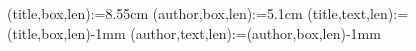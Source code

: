 \novaims(title,box,len):={8.55cm}
\novaims(author,box,len):={5.1cm}
\novaims(title,text,len):={\dimexpr \thenovaims(title,box,len)-1mm}
\novaims(author,text,len):={\dimexpr \thenovaims(author,box,len)-1mm}

\newlength{\novathesis@spinewidth}%
\setlength{\novathesis@spinewidth}{1mm * (\thelastsheet+ 19) / 20}%

\newlength{\novathesis@boxwidth}
\ifdim\novathesis@spinewidth > 6mm
  \setlength{\novathesis@boxwidth}{\novathesis@spinewidth-2mm}%
\else
  \setlength{\novathesis@boxwidth}{4mm}%
\fi
\newlength{\novathesis@spinetextwidth}
\setlength{\novathesis@spinetextwidth}{\novathesis@boxwidth-1mm}%


\newlength{\spine@len@top}
\setlength{\spine@len@top}{\thespine(top)}
\newlength{\spine@len@bottom}
\setlength{\spine@len@bottom}{\thespine(bottom)}
\newlength{\spine@len@name}
\newlength{\spine@len@title}
\newlength{\spine@len@year}
\newlength{\spine@len@all}
\setlength{\spine@len@all}{\spine@len@year+\spine@len@name+\spine@len@title
                           +\spine@len@top+\spine@len@bottom}
\newlength{\spine@len@gap}
\setlength{\spine@len@gap}{\stockheight-\spine@len@all}
  

\newcommand{\spinetext}{%
  \thespine(font)%
  \hspace*{\spine@len@bottom}%
  \thespine(year)%
  \hspace*{0.33\spine@len@gap}%
  \thespine(title)%
  \hspace*{0.34\spine@len@gap}%
  \thespine(author)%
  \hspace*{0.33\spine@len@gap}%
  \hspace*{\spine@len@top}%
}

